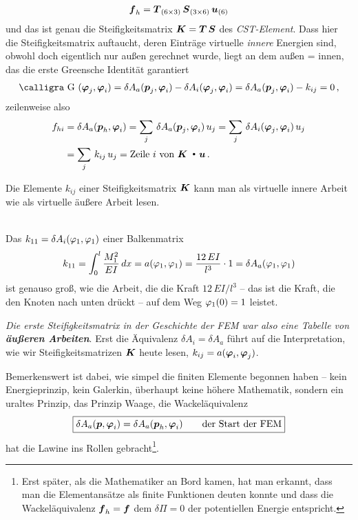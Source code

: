 \begin{align}
\mbox{\boldmath $f$}_h = \mbox{\boldmath $T$}_{(6 \times 3)}\,\mbox{\boldmath $S$}_{(3 \times 6)}\,\mbox{\boldmath $u$}_{(6)}
\end{align}
und das ist genau die Steifigkeitsmatrix $\mbox{\boldmath $K$} = \mbox{\boldmath $T$}\,\mbox{\boldmath $S$}$ des {\em CST-Element\/}. Dass hier die Steifigkeitsmatrix auftaucht, deren Eintr\"{a}ge virtuelle {\em innere\/} Energien sind, obwohl doch eigentlich nur \glq au{\ss}en\grq{} gerechnet wurde, liegt an dem \glq au{\ss}en = innen\grq{}, das die erste Greensche Identit\"{a}t garantiert
\begin{align}
\text{\normalfont\calligra G\,\,}(\vek \Np_j,\vek \Np_i) = \delta A_a(\vek p_j,\vek \Np_i) - \delta A_i(\vek \Np_j,\vek \Np_i) = \delta A_a(\vek p_j,\vek \Np_i)-  k_{ij} =0\,,
\end{align}
zeilenweise also
\begin{align}
f_{hi} &= \delta A_a(\mbox{\boldmath $p$}_h,\mbox{\boldmath $\varphi$}_i) = \sum_j\,\delta A_a(\mbox{\boldmath $p$}_j,\mbox{\boldmath $\varphi$}_i)\,u_j =  \sum_j\,\delta A_i(\mbox{\boldmath $\varphi$}_j,\mbox{\boldmath $\varphi$}_i)\,u_j \nonumber \\
&= \sum_j\,k_{ij}\,u_j = \text{Zeile $i$ von $\mbox{\boldmath $K$}$ ${\,\scriptscriptstyle \stackrel{\bullet}{{}}}\,\,\mbox{\boldmath $u$}$}\,.
\end{align}

\hspace*{-12pt}\colorbox{highlightBlue}{\parbox{0.98\textwidth}{Die Elemente $k_{ij}$ einer Steifigkeitsmatrix $\mbox{\boldmath $K$}$ kann man als virtuelle innere Arbeit wie als virtuelle \"{a}u{\ss}ere Arbeit lesen.}}\\

Das $k_{11} = \delta A_i(\varphi_1,\varphi_1)$ einer Balkenmatrix
\begin{align}
 k_{11} = \int_{0}^{l}\frac{M_1^2}{EI}\,dx = a(\varphi_1,\varphi_1) = \frac{12\,EI}{l^3} \cdot 1 = \delta A_a(\varphi_1,\varphi_1)
\end{align}
ist genauso gro{\ss}, wie die Arbeit, die die Kraft $12\,EI/l^3$ -- das ist die Kraft, die den Knoten nach unten dr\"{u}ckt -- auf dem Weg $\varphi_1(0) = 1$ leistet.

{\em Die \glq erste\grq{} Steifigkeitsmatrix in der Geschichte der FEM war also eine Tabelle von {\bf \"{a}u{\ss}eren Arbeiten}\/}. Erst die \"{A}quivalenz $\delta A_i = \delta A_a$ f\"{u}hrt auf die Interpretation, wie wir Steifigkeitsmatrizen $\mbox{\boldmath $K$}$ heute lesen, $k_{ij} = a(\mbox{\boldmath $\varphi$}_i,\mbox{\boldmath $\varphi$}_j)$.

Bemerkenswert ist dabei, wie simpel die finiten Elemente begonnen haben -- kein Energieprinzip, kein Galerkin, \"{u}berhaupt keine h\"{o}here Mathematik, sondern ein uraltes Prinzip, das Prinzip Waage, die \glq Wackel\"{a}quivalenz\grq{}\,
\begin{align}
 \boxed{\delta A_a(\mbox{\boldmath $p$}, \mbox{\boldmath $\varphi$}_i) = \delta A_a(\mbox{\boldmath $p$}_h,\mbox{\boldmath $\varphi$}_i) \qquad \text{der Start der FEM}}
\end{align}
hat die Lawine ins Rollen gebracht\footnote{
Erst sp\"{a}ter, als die Mathematiker an Bord  kamen, hat man erkannt, dass man die Elementans\"{a}tze  als finite Funktionen deuten konnte und dass die Wackel\"{a}quivalenz $\mbox{\boldmath $f$}_h = \mbox{\boldmath $f$}$ dem $\delta \Pi = 0 $ der potentiellen Energie entspricht.}.





